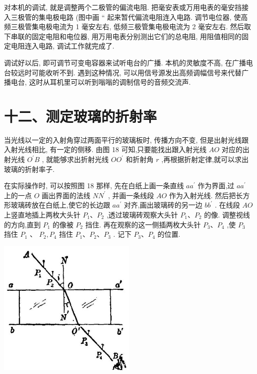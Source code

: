 \documentclass[10pt]{article}
\begin{document}
对本机的调试, 就是调整两个二极管的偏流电阻. 把毫安表或万用电表的毫安挡接入三极管的集电极电路 (图中画 “ 起来暂代偏流电阻连入电路. 调节电位器, 使高频三极管集电极电流为 1 毫安左右, 低频三极管集电极电流为 2 毫安左右. 然后取下串联的固定电阻和电位器, 用万用电表分别测出它们的总电阻, 用阻值相同的固定电阻连入电路, 调试工作就完成了.

调试好以后, 即可调节可变电容器来试听电台的广播. 本机的灵敏度不高, 在广播电台较远时可能收听不到. 遇到这种情况, 可以用信号源发出高频调幅信号来代替广播电台, 这时从耳机里可以听到嗡嗡的调制信号的音频交流声.

\section*{十二、测定玻璃的折射率}

当光线以一定的入射角穿过两面平行的玻璃板时, 传播方向不变, 但是出射光线跟入射光线相比, 有一定的侧移. 由图 18 可知,只要能找出跟入射光线 \({AO}\) 对应的出射光线 \({O}^{\prime }B\) , 就能够求出折射光线 \(O{O}^{\prime }\) 和折射角 \(r\) ,再根据折射定律,就可以求出玻璃的折射率子.

在实际操作时, 可以按照图 18 那样, 先在白纸上画一条直线 \(a{a}^{\prime }\) 作为界面,过 \(a{a}^{\prime }\) 上的一点 \(O\) 画出界面的法线 \(N{N}^{\prime }\) , 并画一条线段 \({AO}\) 作为入射光线. 然后把长方形玻璃砖放在白纸上,使它的长边跟 \(a{a}^{\prime }\) 对齐,画出玻璃砖的另一边 \(b{b}^{\prime }\) . 在线段 \({AO}\) 上竖直地插上两枚大头针 \({P}_{1}\text{、}{P}_{2}\) ,透过玻璃砖观察大头针 \({P}_{1}\text{、}{P}_{2}\) 的像. 调整视线的方向,直到 \({P}_{1}\) 的像被 \({P}_{2}\) 挡住. 再在观察的这一侧插两枚大头针 \({P}_{3}\text{、}{P}_{4}\) ,使 \({P}_{3}\) 挡住 \({P}_{1}\) 、 \({P}_{2},{P}_{4}\) 挡住 \({P}_{1}\text{、}{P}_{2}\text{、}{P}_{3}\) . 记下 \({P}_{3}\text{、}{P}_{4}\) 的位置.

\begin{center}
\includegraphics[max width=0.5\textwidth]{images/01913056-1f15-74d8-9184-9aab52c9d66b_392_724770.jpg}
\end{center}
\end{document}
